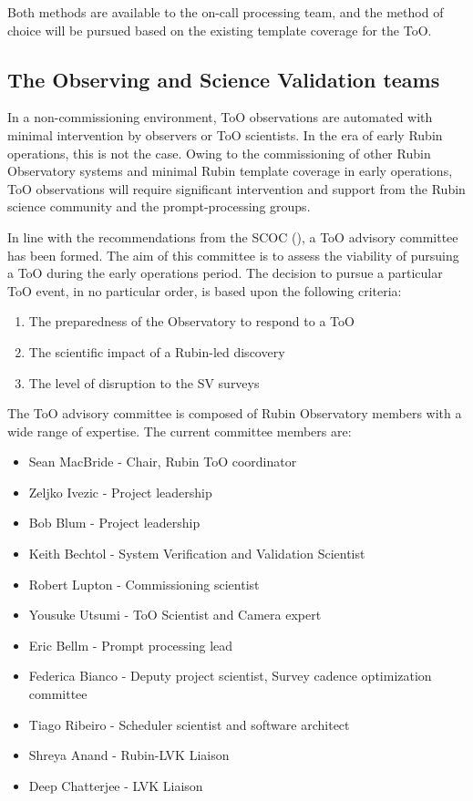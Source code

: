 Both methods are available to the on-call processing team, and the method of choice will be pursued based on the existing template coverage for the ToO.

\subsection{The Observing and Science Validation teams}\label{subsec:ObsSVTeams}

In a non-commissioning environment, ToO observations are automated with minimal intervention by observers or ToO scientists. In the era of early Rubin operations, this is not the case. Owing to the commissioning of other Rubin Observatory systems and minimal Rubin template coverage in early operations, ToO observations will require significant intervention and support from the Rubin science community and the prompt-processing groups. 

In line with the recommendations from the SCOC (\cite{PSTN-056}), a ToO advisory committee has been formed. The aim of this committee is to assess the viability of pursuing a ToO during the early operations period. The decision to pursue a particular ToO event, in no particular order, is based upon the following criteria:

\begin{enumerate}
    \item The preparedness of the Observatory to respond to a ToO
    \item The scientific impact of a Rubin-led discovery
    \item The level of disruption to the SV surveys
\end{enumerate}

The ToO advisory committee is composed of Rubin Observatory members with a wide range of expertise. The current committee members are:

\begin{itemize}

    \item Sean MacBride - Chair, Rubin ToO coordinator
    \item Zeljko Ivezic - Project leadership
    \item Bob Blum - Project leadership
    \item Keith Bechtol - System Verification and Validation Scientist
    \item Robert Lupton - Commissioning scientist
    \item Yousuke Utsumi - ToO Scientist and Camera expert
    \item Eric Bellm - Prompt processing lead
    \item Federica Bianco - Deputy project scientist, Survey cadence optimization committee
    \item Tiago Ribeiro - Scheduler scientist and software architect
    \item Shreya Anand - Rubin-LVK Liaison
    \item Deep Chatterjee - LVK Liaison
\end{itemize}